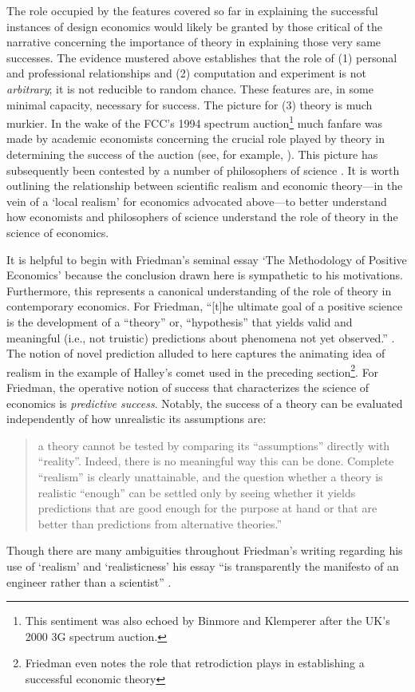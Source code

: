 The role occupied by the features covered so far in explaining the successful instances of design economics would likely be granted by those critical of the narrative concerning the importance of theory in explaining those very same successes. The evidence mustered above establishes that the role of (1) personal and professional relationships and (2) computation and experiment is not \textit{arbitrary}; it is not reducible to random chance. These features are, in some minimal capacity, necessary for success. The picture for (3) theory is much murkier. In the wake of the FCC's 1994 spectrum auction\footnote{This sentiment was also echoed by Binmore and Klemperer \autocite*{binmore2002} after the UK's 2000 3G spectrum auction.} much fanfare was made by academic economists concerning the crucial role played by theory in determining the success of the auction (see, for example, \cite{mcafee1996,mcmillan1994}). This picture has subsequently been contested by a number of philosophers of science \autocite{nikkhah2008,alexandrova2009}. It is worth outlining the relationship between scientific realism and economic theory---in the vein of a `local realism' for economics \autocite{maki2009} advocated above---to better understand how economists and philosophers of science understand the role of theory in the science of economics.

It is helpful to begin with Friedman's \autocite*{friedman1953} seminal essay `The Methodology of Positive Economics' because the conclusion drawn here is sympathetic to his motivations. Furthermore, this represents a canonical understanding of the role of theory in contemporary economics. For Friedman, ``[t]he ultimate goal of a positive science is the development of a ``theory'' or, ``hypothesis'' that yields valid and meaningful (i.e., not truistic) predictions about phenomena not yet observed.'' \autocite[7]{friedman1953}. The notion of novel prediction alluded to here captures the animating idea of realism in the example of Halley's comet used in the preceding section\footnote{Friedman \autocite*[9]{friedman1953} even notes the role that retrodiction plays in establishing a successful economic theory}. For Friedman, the operative notion of success that characterizes the science of economics is \textit{predictive success}. Notably, the success of a theory can be evaluated independently of how unrealistic its assumptions are:
\begin{quote}
    a theory cannot be tested by comparing its ``assumptions'' directly with ``reality''. Indeed, there is no meaningful way this can be done. Complete ``realism'' is clearly unattainable, and the question whether a theory is realistic ``enough'' can be settled only by seeing whether it yields predictions that are good enough for the purpose at hand or that are better than predictions from alternative theories.'' \autocite[41]{friedman1953}
\end{quote}
\noindent Though there are many ambiguities throughout Friedman's writing regarding his use of `realism' and `realisticness' his essay ``is transparently the manifesto of an engineer rather than a scientist'' \autocite[740]{ross2008}. 

